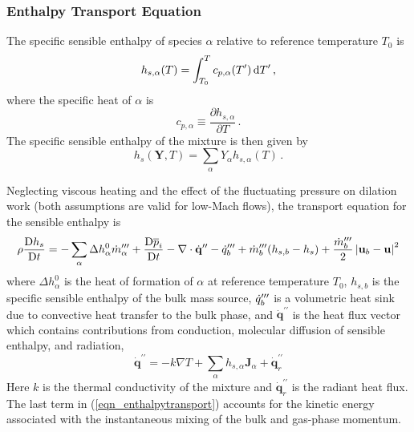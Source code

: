 \documentclass[11pt]{book}
\begin{document}
\subsubsection{Enthalpy Transport Equation}
\label{enthalpy_definitions}

The specific sensible enthalpy of species $\alpha$ relative to reference temperature $T_0$ is
\begin{equation}
\label{eqn_sensible}
h_{s,\alpha}(T) = \int_{T_0}^{T} c_{p,\alpha}(T^\prime) \,\mathrm{d} T^\prime \,\mbox{,}
\end{equation}
where the specific heat of $\alpha$ is
\begin{equation}
\label{eqn_specificheat}
c_{p,\alpha} \equiv \frac{\partial h_{s,\alpha}}{\partial T} \,\mbox{.}
\end{equation}
The specific sensible enthalpy of the mixture is then given by
\begin{equation}
\label{eqn_chemsensmix}
h_s(\mathbf{Y},T) = \sum_\alpha Y_\alpha h_{s,\alpha}(T) \,\mbox{.}
\end{equation}

Neglecting viscous heating and the effect of the fluctuating pressure on dilation work (both assumptions are valid for low-Mach flows), the transport equation for the sensible enthalpy is
\begin{equation}
\label{eqn_enthalpytransport}
\rho \frac{\mbox{D} h_s }{\mbox{D} t} = -\sum_\alpha \Delta h^0_\alpha \dot{m}_{\alpha}^{{\prime\prime\prime}} + \frac{\mbox{D} \overline{p}_i }{\mbox{D} t} - \nabla\cdot \dot{\mathbf{q}}^{\prime\prime} - \dot{q}_b''' + \dot{m}_{b}^{{\prime\prime\prime}} ( h_{s,b} - h_s ) + \frac{\dot{m}_{b}^{{\prime\prime\prime}}}{2}\left|\mathbf{u}_b-\mathbf{u}\right|^2
\end{equation}
where $\Delta h^0_\alpha$ is the heat of formation of $\alpha$ at reference temperature $T_0$, $h_{s,b}$ is the specific sensible enthalpy of the bulk mass source, $\dot{q}_b^{{\prime\prime\prime}}$ is a volumetric heat sink due to convective heat transfer to the bulk phase, and $\dot{\mathbf{q}}^{\prime\prime}$ is the heat flux vector which contains contributions from conduction, molecular diffusion of sensible enthalpy, and radiation,
\begin{equation}
\label{eqn_heatflux}
\dot{\mathbf{q}}^{\prime\prime} = -k \nabla T + \sum_\alpha h_{s,\alpha} \mathbf{J}_{\alpha} + \dot{\mathbf{q}}^{\prime\prime}_{r}
\end{equation}
Here $k$ is the thermal conductivity of the mixture and $\dot{\mathbf{q}}^{\prime\prime}_{r}$ is the radiant heat flux.  The last term in (\ref{eqn_enthalpytransport}) accounts for the kinetic energy associated with the instantaneous mixing of the bulk and gas-phase momentum.
\end{document}

